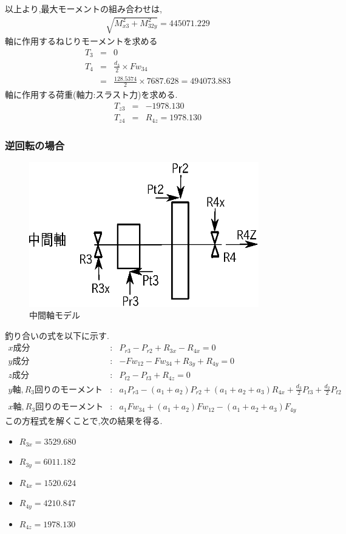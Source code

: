 以上より,最大モーメントの組み合わせは,
\begin{eqnarray}
\sqrt{ M_{x3}^2 + M_{32y}^2 } = 445071.229
\end{eqnarray}
軸に作用するねじりモーメントを求める
\begin{eqnarray}
T_{3} &=& 0\\
T_{4} &=& \frac{d_3}{2} \times Fw_{34}\\
      &=& \frac{128.5374}{2} \times 7687.628 = 494073.883
\end{eqnarray}
軸に作用する荷重(軸力:スラスト力)を求める.
\begin{eqnarray}
T_{z3} &=& -1978.130\\
T_{z4} &=& R_{4z} = 1978.130
\end{eqnarray}
\subsubsection{逆回転の場合}
\begin{figure}[htbp]
\begin{center}
\includegraphics[width=10cm]{../picture/jiku43.eps}
\end{center}
\caption{中間軸モデル}
\end{figure}
釣り合いの式を以下に示す.
\begin{eqnarray}
x成分&:&P_{r3}-P_{r2}+R_{3x}-R_{4x}=0\\
y成分&:&-Fw_{12}-Fw_{34}+R_{3y}+R_{4y}=0\\
z成分&:&P_{t2}-P_{t3}+R_{4z}=0\\
y軸,R_3回りのモーメント&:&a_1P_{r3}-(a_1+a_2)P_{r2}+(a_1+a_2+a_3)R_{4x}+\frac{d_3}{2}P_{t3}+\frac{d_2}{2}P_{t2}\nonumber\\
\\
x軸,R_3回りのモーメント&:&a_1Fw_{34}+(a_1+a_2)Fw_{12}-(a_1+a_2+a_3)F_{4y}
\end{eqnarray}
この方程式を解くことで,次の結果を得る.
\begin{itemize}
\item $R_{3x} = 3529.680$
\item $R_{3y} = 6011.182$
\item $R_{4x} = 1520.624$
\item $R_{4y} = 4210.847$
\item $R_{4z} = 1978.130$
\end{itemize}
